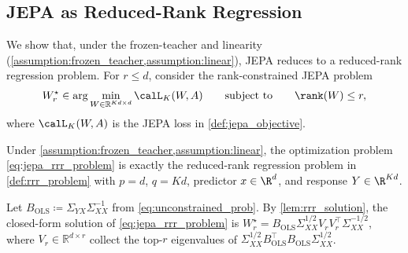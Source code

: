 
\subsection{JEPA as Reduced-Rank Regression}
\label{sec:jepa_rrr}

We show that, under the frozen-teacher and linearity (\cref{assumption:frozen_teacher,assumption:linear}), JEPA reduces to a reduced-rank regression problem.
For $r \le d$, consider the rank-constrained JEPA problem
\begin{align}
    W_r^\star
    \in
    \arg\min_{W \in \mathbb{R}^{Kd \times d}}
    \calL_K(W,A)
    \qquad \text{subject to} \qquad \rank(W) \le r,
    \label{eq:jepa_rrr_problem}
\end{align}
where $\calL_K(W,A)$ is the JEPA loss in \cref{def:jepa_objective}.
\begin{proposition}
\label{prop:jepa_rrr}
Under \cref{assumption:frozen_teacher,assumption:linear}, the optimization
problem \eqref{eq:jepa_rrr_problem} is exactly the reduced-rank regression
problem in \cref{def:rrr_problem} with $p=d$, $q=Kd$, predictor $ x \in \R^d$, and response $ Y \in \R^{Kd}$.
\end{proposition}

Let $B_{\mathrm{OLS}} \coloneqq \Sigma_{YX}\Sigma_{XX}^{-1}$ from \eqref{eq:unconstrained_prob}.
By \cref{lem:rrr_solution}, the closed-form solution of \eqref{eq:jepa_rrr_problem} is $    W_r^\star = B_{\mathrm{OLS}} \Sigma_{XX}^{1/2} V_r V_r^\top \Sigma_{XX}^{-1/2}$, where $V_r \in \mathbb R^{d \times r}$ collect the top-$r$ eigenvalues of $\Sigma_{XX}^{1/2} B_{\mathrm{OLS}}^\top B_{\mathrm{OLS}} \Sigma_{XX}^{1/2}$.

